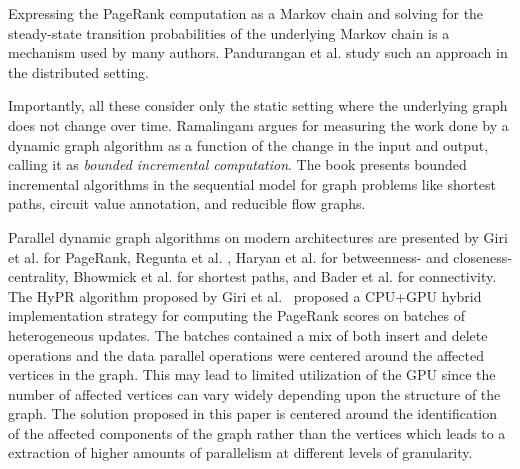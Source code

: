 Expressing the PageRank computation as a Markov chain and solving for the steady-state transition probabilities of the underlying Markov chain is a mechanism used by many authors. Pandurangan et al. \cite{pr-sarma13} study such an approach in the distributed setting.

Importantly, all these consider only the static setting where the underlying graph does not change over time. Ramalingam \cite{incr-ramalingam96} argues for measuring the work done by a dynamic graph algorithm as a function of the change in the input and output, calling it as {\em bounded incremental computation}. The book presents bounded incremental algorithms in the sequential model for graph problems like shortest paths, circuit value annotation, and reducible flow graphs.  

Parallel dynamic graph algorithms on modern architectures are presented by Giri et al. \cite{hipc19} for PageRank, Regunta et al. \cite{cent-shukla20}, Haryan et al. \cite{cent-shukla20} for betweenness- and closeness-centrality, Bhowmick et al. \cite{sssp-khanda22} for shortest paths, and Bader et al. \cite{cc-mccoll13} for connectivity. The HyPR algorithm proposed by Giri et al.~\cite{hipc19} proposed a CPU+GPU hybrid implementation strategy for computing the PageRank scores on batches of heterogeneous updates. The batches contained a mix of both insert and delete operations and the data parallel operations were centered around the affected vertices in the graph. This may lead to limited utilization of the GPU since the number of affected vertices can vary widely depending upon the structure of the graph. The solution proposed in this paper is centered around the identification of the affected components of the graph rather than the vertices which leads to a extraction of higher amounts of parallelism at different levels of granularity.








